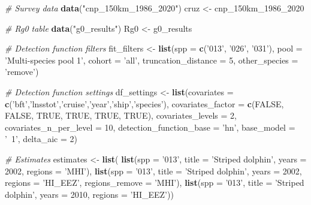 \documentclass[
]{book}
\newenvironment{Shaded}{\begin{snugshade}}{\end{snugshade}}
\newcommand{\CommentTok}[1]{\textcolor[rgb]{0.56,0.35,0.01}{\textit{#1}}}
\newcommand{\DataTypeTok}[1]{\textcolor[rgb]{0.13,0.29,0.53}{#1}}
\newcommand{\DecValTok}[1]{\textcolor[rgb]{0.00,0.00,0.81}{#1}}
\newcommand{\KeywordTok}[1]{\textcolor[rgb]{0.13,0.29,0.53}{\textbf{#1}}}
\newcommand{\NormalTok}[1]{#1}
\newcommand{\OtherTok}[1]{\textcolor[rgb]{0.56,0.35,0.01}{#1}}
\newcommand{\StringTok}[1]{\textcolor[rgb]{0.31,0.60,0.02}{#1}}
\begin{document}
\begin{Shaded}
\begin{Highlighting}[]
\CommentTok{# Survey data}
\KeywordTok{data}\NormalTok{(}\StringTok{"cnp_150km_1986_2020"}\NormalTok{)}
\NormalTok{cruz <-}\StringTok{ }\NormalTok{cnp_150km_}\DecValTok{1986}\NormalTok{_}\DecValTok{2020}

\CommentTok{# Rg0 table}
\KeywordTok{data}\NormalTok{(}\StringTok{"g0_results"}\NormalTok{)}
\NormalTok{Rg0 <-}\StringTok{ }\NormalTok{g0_results}

\CommentTok{# Detection function filters}
\NormalTok{fit_filters <-}\StringTok{ }\KeywordTok{list}\NormalTok{(}\DataTypeTok{spp =} \KeywordTok{c}\NormalTok{(}\StringTok{'013'}\NormalTok{, }\StringTok{'026'}\NormalTok{, }\StringTok{'031'}\NormalTok{), }
                   \DataTypeTok{pool =} \StringTok{'Multi-species pool 1'}\NormalTok{,}
                   \DataTypeTok{cohort =} \StringTok{'all'}\NormalTok{,}
                   \DataTypeTok{truncation_distance =} \DecValTok{5}\NormalTok{,}
                   \DataTypeTok{other_species =} \StringTok{'remove'}\NormalTok{)}

\CommentTok{# Detection function settings}
\NormalTok{df_settings <-}\StringTok{ }\KeywordTok{list}\NormalTok{(}\DataTypeTok{covariates =} \KeywordTok{c}\NormalTok{(}\StringTok{'bft'}\NormalTok{,}\StringTok{'lnsstot'}\NormalTok{,}\StringTok{'cruise'}\NormalTok{,}\StringTok{'year'}\NormalTok{,}\StringTok{'ship'}\NormalTok{,}\StringTok{'species'}\NormalTok{),}
                   \DataTypeTok{covariates_factor =} \KeywordTok{c}\NormalTok{(}\OtherTok{FALSE}\NormalTok{, }\OtherTok{FALSE}\NormalTok{, }\OtherTok{TRUE}\NormalTok{, }\OtherTok{TRUE}\NormalTok{, }\OtherTok{TRUE}\NormalTok{, }\OtherTok{TRUE}\NormalTok{),}
                   \DataTypeTok{covariates_levels =} \DecValTok{2}\NormalTok{,}
                   \DataTypeTok{covariates_n_per_level =} \DecValTok{10}\NormalTok{,}
                   \DataTypeTok{detection_function_base =} \StringTok{'hn'}\NormalTok{,}
                   \DataTypeTok{base_model =} \StringTok{'~1'}\NormalTok{,}
                   \DataTypeTok{delta_aic =} \DecValTok{2}\NormalTok{)}

\CommentTok{# Estimates}
\NormalTok{estimates <-}\StringTok{ }\KeywordTok{list}\NormalTok{(}
    \KeywordTok{list}\NormalTok{(}\DataTypeTok{spp =} \StringTok{'013'}\NormalTok{,}
         \DataTypeTok{title =} \StringTok{'Striped dolphin'}\NormalTok{,}
         \DataTypeTok{years =} \DecValTok{2002}\NormalTok{,}
         \DataTypeTok{regions =} \StringTok{'MHI'}\NormalTok{),}
    \KeywordTok{list}\NormalTok{(}\DataTypeTok{spp =} \StringTok{'013'}\NormalTok{,}
         \DataTypeTok{title =} \StringTok{'Striped dolphin'}\NormalTok{,}
         \DataTypeTok{years =} \DecValTok{2002}\NormalTok{,}
         \DataTypeTok{regions =} \StringTok{'HI_EEZ'}\NormalTok{,}
         \DataTypeTok{regions_remove =} \StringTok{'MHI'}\NormalTok{),}
    \KeywordTok{list}\NormalTok{(}\DataTypeTok{spp =} \StringTok{'013'}\NormalTok{,}
         \DataTypeTok{title =} \StringTok{'Striped dolphin'}\NormalTok{,}
         \DataTypeTok{years =} \DecValTok{2010}\NormalTok{,}
         \DataTypeTok{regions =} \StringTok{'HI_EEZ'}\NormalTok{))}


\end{Highlighting}
\end{Shaded}
\end{document}
